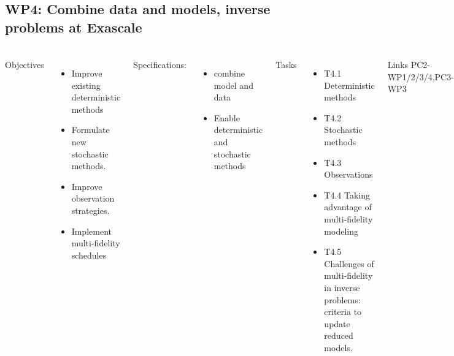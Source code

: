 \subsection{WP4: Combine data and models, inverse problems at Exascale }
\begin{frame}
  \frametitle{\insertsectionhead}
  \framesubtitle{\insertsubsectionhead}
  \begin{columns}[t]
    Objectives
    \begin{itemize}
      \item Improve existing deterministic methods 
      \item  Formulate new stochastic methods. 
      \item Improve observation strategies.
      \item Implement multi-fidelity schedules  
    \end{itemize}
    Specifications:
    \begin{itemize}
      \item combine model and data 
      \item Enable deterministic and stochastic methods
    \end{itemize}
    Tasks
    \begin{itemize}
      \item T4.1 Deterministic methods
      \item T4.2 Stochastic methods
      \item T4.3 Observations
      \item T4.4 Taking advantage of multi-fidelity modeling
      \item T4.5 Challenges of multi-fidelity in inverse problems: criteria to update reduced models.
    \end{itemize}
    \begin{alertblock}{Links}
    PC2-WP1/2/3/4,PC3-WP3
  \end{alertblock}
  \end{columns}
\end{frame}

